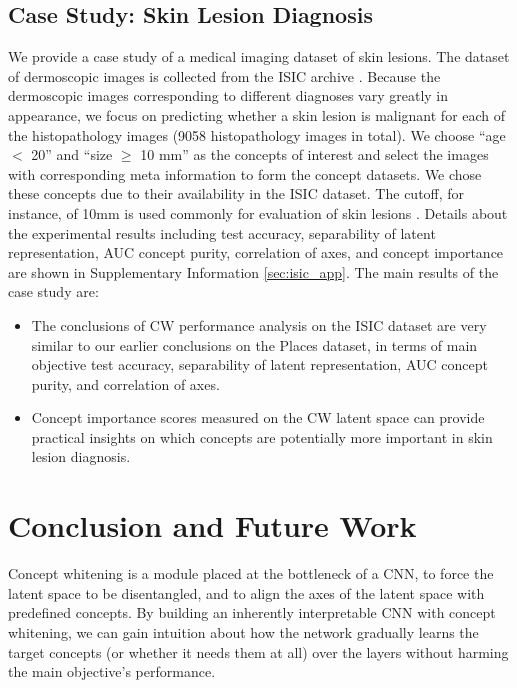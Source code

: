 \documentclass{article}
\begin{document}
\subsection{Case Study: Skin Lesion Diagnosis}
\label{sec:isic}
We provide a case study of a medical imaging dataset of skin lesions. The dataset of dermoscopic images is collected from the ISIC archive \cite{isic2020}. Because the dermoscopic images corresponding to different diagnoses vary greatly in appearance, we focus on predicting whether a skin lesion is malignant for each of the histopathology images (9058 histopathology images in total). We choose ``age $<$ 20'' and ``size $\geq$ 10 mm'' as the concepts of interest and select the images with corresponding meta information to form the concept datasets. We chose these concepts due to their availability in the ISIC dataset. The cutoff, for instance, of 10mm is used commonly for evaluation of skin lesions \cite{lewis1998}. Details about the experimental results 
including test accuracy, separability of latent representation, AUC concept purity, correlation of axes, and concept importance are shown in Supplementary Information \ref{sec:isic_app}. The main results of the case study are: 
\begin{itemize}
\item The conclusions of CW performance analysis on the ISIC dataset are very similar to our earlier conclusions on the Places dataset, in terms of main objective test accuracy, separability of latent representation, AUC concept purity, and correlation of axes. \item Concept importance scores measured on the CW latent space can provide practical insights on which concepts are potentially more important in skin lesion diagnosis.
\end{itemize}

\section{Conclusion and Future Work}
\label{sec:conclusion}
Concept whitening is a module placed at the bottleneck of a CNN, to force the latent space to be disentangled, and to align the axes of the latent space with predefined concepts. By building an inherently interpretable CNN with concept whitening, we can gain intuition about how the network gradually learns the target concepts (or whether it needs them at all) over the layers without harming the main objective's performance.
\end{document}
